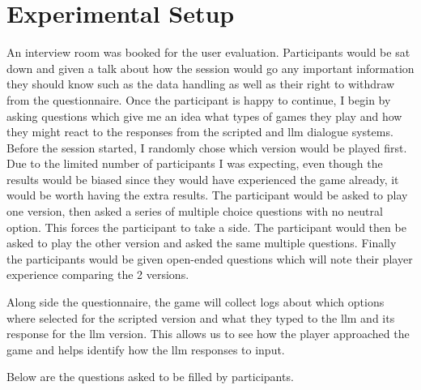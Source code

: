 \documentclass[12pt, a4paper]{report}
\begin{document}
	\section{Experimental Setup}
	
	An interview room was booked for the user evaluation. Participants would be sat down and given a talk about how the session would go any important information they should know such as the data handling as well as their right to withdraw from the questionnaire. Once the participant is happy to continue, I begin by asking questions which give me an idea what types of games they play and how they might react to the responses from the scripted and \gls{llm} dialogue systems. Before the session started, I randomly chose which version would be played first. Due to the limited number of participants I was expecting, even though the results would be biased since they would have experienced the game already, it would be worth having the extra results. The participant would be asked to play one version, then asked a series of multiple choice questions with no neutral option. This forces the participant to take a side. The participant would then be asked to play the other version and asked the same multiple questions. Finally the participants would be given open-ended questions which will note their player experience comparing the 2 versions.

	Along side the questionnaire, the game will collect logs about which options where selected for the scripted version and what they typed to the \gls{llm} and its response for the \gls{llm} version. This allows us to see how the player approached the game and helps identify how the \gls{llm} responses to input.
	
	Below are the questions asked to be filled by participants.
	
\end{document}
